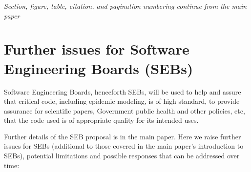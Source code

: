 \documentclass[10pt,a4paper]{article}
\begin{document}
\setcounter{section}{\continueSectionNumbers}
\setcounter{table}{\continueTableNumbers}
\setcounter{figure}{\continueFigureNumbers}
\setcounter{footnote}{\continueFootnoteNumbers}
\setcounter{page}{\continuePageNumbers}
\addtocounter{page}{1} %

\makeatletter
\let \bslash = \@backslashchar
\makeatother

\newpage
\begin{center}
\emph{Section, figure, table, citation, and pagination numbering continue from the main paper}
\end{center}

\setcounter{tocdepth}{3}

\tableofcontents
\newpage

\section{Further issues for Software Engineering Boards (SEBs)}

Software Engineering Boards, henceforth SEBs, will be used to help and assure that critical code, including epidemic modeling, is of high standard, to provide assurance for scientific papers, Government public health and other policies, etc, that the code used is of appropriate quality for its intended uses.  

Further details of the SEB proposal is in the main paper. Here we raise further issues for SEBs (additional to those covered in the main paper's introduction to SEBs), potential limitations and possible responses that can be addressed over time:
\end{document}
